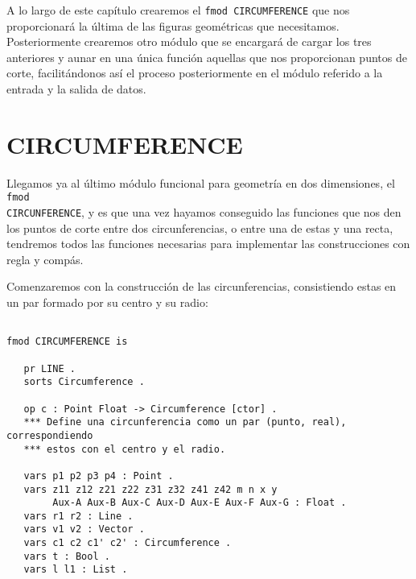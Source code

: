 
A lo largo de este capítulo crearemos el \texttt{fmod CIRCUMFERENCE} que nos proporcionará la última de las figuras geométricas que necesitamos. Posteriormente crearemos otro módulo que se encargará de cargar los tres anteriores y aunar en una única función aquellas que nos proporcionan puntos de corte, facilitándonos así el proceso posteriormente en el módulo referido a la entrada y la salida de datos.\par

\section{CIRCUMFERENCE}

Llegamos ya al último módulo funcional para geometría en dos dimensiones, el \texttt{fmod} \\ \texttt{CIRCUNFERENCE}, y es que una vez hayamos conseguido las funciones que nos den los puntos de corte entre dos circunferencias, o entre una de estas y una recta, tendremos todos las funciones necesarias para implementar las construcciones con regla y compás. \par

Comenzaremos con la construcción de las circunferencias, consistiendo estas en un par formado por su centro y su radio: \par

{\codesize
\begin{verbatim}

fmod CIRCUMFERENCE is

   pr LINE .
   sorts Circumference .

   op c : Point Float -> Circumference [ctor] .
   *** Define una circunferencia como un par (punto, real), correspondiendo 
   *** estos con el centro y el radio.
	
   vars p1 p2 p3 p4 : Point .
   vars z11 z12 z21 z22 z31 z32 z41 z42 m n x y 
        Aux-A Aux-B Aux-C Aux-D Aux-E Aux-F Aux-G : Float .
   vars r1 r2 : Line .
   vars v1 v2 : Vector .
   vars c1 c2 c1' c2' : Circumference .
   vars t : Bool .
   vars l l1 : List .
\end{verbatim}
}

